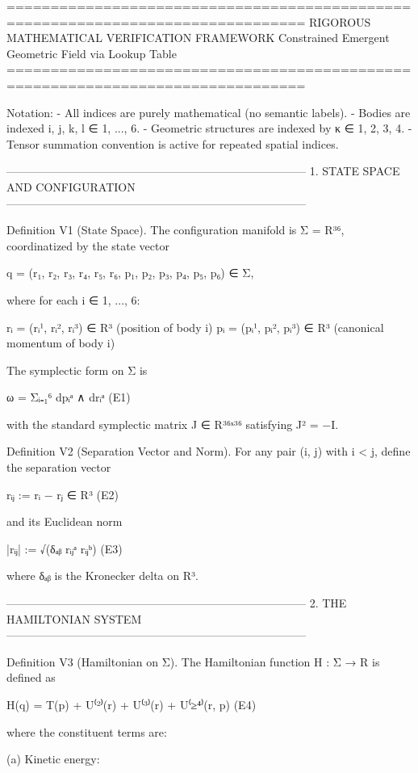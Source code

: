 ================================================================================
RIGOROUS MATHEMATICAL VERIFICATION FRAMEWORK
Constrained Emergent Geometric Field via Lookup Table
================================================================================

Notation:
  - All indices are purely mathematical (no semantic labels).
  - Bodies are indexed i, j, k, l ∈ {1, ..., 6}.
  - Geometric structures are indexed by κ ∈ {1, 2, 3, 4}.
  - Tensor summation convention is active for repeated spatial indices.


--------------------------------------------------------------------------------
1. STATE SPACE AND CONFIGURATION
--------------------------------------------------------------------------------

Definition V1 (State Space).
The configuration manifold is Σ = R³⁶, coordinatized by the state vector

    q = (r₁, r₂, r₃, r₄, r₅, r₆, p₁, p₂, p₃, p₄, p₅, p₆)  ∈ Σ,

where for each i ∈ {1, ..., 6}:

    rᵢ = (rᵢ¹, rᵢ², rᵢ³) ∈ R³      (position of body i)
    pᵢ = (pᵢ¹, pᵢ², pᵢ³) ∈ R³      (canonical momentum of body i)

The symplectic form on Σ is

    ω = Σᵢ₌₁⁶  dpᵢᵃ ∧ drᵢᵃ                        (E1)

with the standard symplectic matrix J ∈ R³⁶ˣ³⁶ satisfying J² = −I.


Definition V2 (Separation Vector and Norm).
For any pair (i, j) with i < j, define the separation vector

    rᵢⱼ := rᵢ − rⱼ ∈ R³                            (E2)

and its Euclidean norm

    |rᵢⱼ| := √(δₐᵦ rᵢⱼᵃ rᵢⱼᵇ)                     (E3)

where δₐᵦ is the Kronecker delta on R³.


--------------------------------------------------------------------------------
2. THE HAMILTONIAN SYSTEM
--------------------------------------------------------------------------------

Definition V3 (Hamiltonian on Σ).
The Hamiltonian function H : Σ → R is defined as

    H(q) = T(p) + U⁽²⁾(r) + U⁽³⁾(r) + U⁽≥⁴⁾(r, p)    (E4)

where the constituent terms are:

(a) Kinetic energy:

